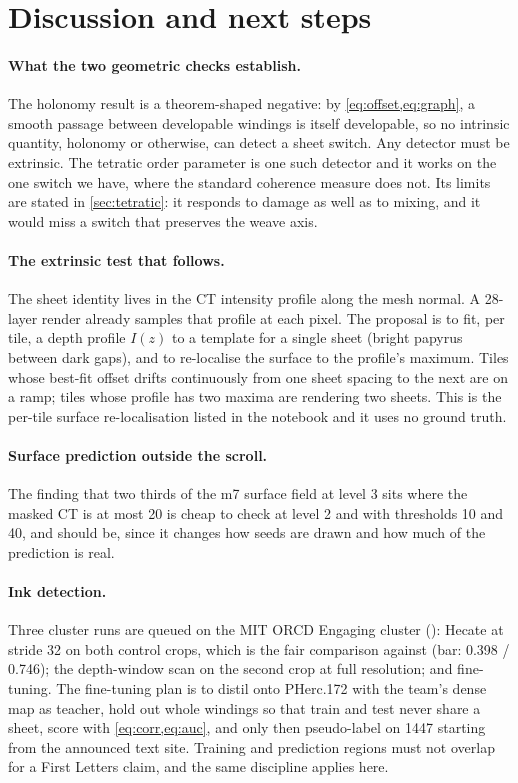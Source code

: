 \section{Discussion and next steps}
\label{sec:discussion}

\paragraph{What the two geometric checks establish.} The holonomy result is a theorem-shaped negative: by \cref{eq:offset,eq:graph}, a smooth passage between developable windings is itself developable, so no intrinsic quantity, holonomy or otherwise, can detect a sheet switch. Any detector must be extrinsic. The tetratic order parameter is one such detector and it works on the one switch we have, where the standard coherence measure does not. Its limits are stated in \cref{sec:tetratic}: it responds to damage as well as to mixing, and it would miss a switch that preserves the weave axis.

\paragraph{The extrinsic test that follows.} The sheet identity lives in the CT intensity profile along the mesh normal. A 28-layer render already samples that profile at each pixel. The proposal is to fit, per tile, a depth profile $I(z)$ to a template for a single sheet (bright papyrus between dark gaps), and to re-localise the surface to the profile's maximum. Tiles whose best-fit offset drifts continuously from one sheet spacing to the next are on a ramp; tiles whose profile has two maxima are rendering two sheets. This is the per-tile surface re-localisation listed in the notebook and it uses no ground truth. 

\paragraph{Surface prediction outside the scroll.} The finding that two thirds of the m7 surface field at level 3 sits where the masked CT is at most 20 is cheap to check at level 2 and with thresholds 10 and 40, and should be, since it changes how seeds are drawn and how much of the prediction is real. 

\paragraph{Ink detection.} Three cluster runs are queued on the MIT ORCD Engaging cluster (): Hecate at stride 32 on both control crops, which is the fair comparison against  (bar: 0.398 / 0.746); the depth-window scan on the second crop at full resolution; and fine-tuning. The fine-tuning plan is to distil onto PHerc.172 with the team's dense map as teacher, hold out whole windings so that train and test never share a sheet, score with \cref{eq:corr,eq:auc}, and only then pseudo-label on 1447 starting from the announced text site. Training and prediction regions must not overlap for a First Letters claim, and the same discipline applies here.

